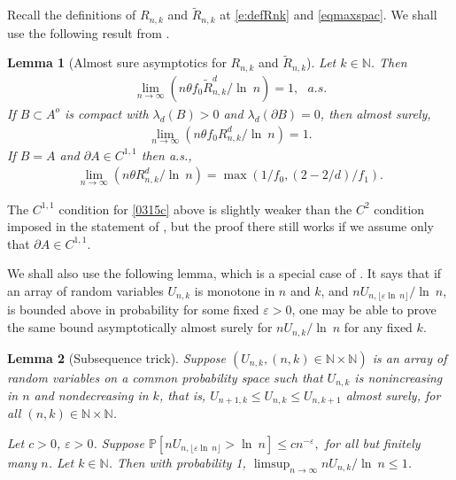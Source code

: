 \documentclass[12pt]{article}
\newcommand{\N}{\mathbb{N}}
\renewcommand{\Pr}{\mathbb{P}}
\newcommand{\tR}{{\tilde{R}}}
\newcommand{\eps}{\varepsilon}
\renewcommand{\log}{{\ln \:}}
\newtheorem{lemm}{Lemma}
\begin{document}
	Recall the definitions of $R_{n,k}$ and $\tR_{n,k}$
	at \eqref{e:defRnk} and \eqref{eqmaxspac}.
	We shall use
 the following result from \cite[Proposition 4.9 and
 Theorem 4.1]{MPCov}.

\begin{lemm}[Almost sure asymptotics for $R_{n,k}$ and $\tR_{n,k}$]
	\label{lem1}
Let  $k \in \N$.
	Then
	\begin{align}
\lim_{n \to \infty} (n \theta  f_0 \tR_{n,k}^d /\log n) =  1,
~~~ a.s.
\label{0315b}
	\end{align}
If $B \subset A^o $ is compact
	with $\lambda_d(B) >0$ and $\lambda_d(\partial B)=0$,
	then almost surely,
	\begin{align}
\lim_{n \to \infty} (n \theta  f_0 R_{n,k}^d /\log n) =  1.
\label{0315a}
	\end{align}
	If $B=A$ and $\partial A \in C^{1,1} $ %
	then
	a.s.,
	\begin{align}
	\lim_{n \to \infty} (n \theta R_{n,k}^d/\log n) =
	\max( 1/f_0, (2-2/d)/f_1).
\label{0315c}
	\end{align}
\end{lemm}
The $C^{1,1}$  condition for \eqref{0315c} above is slightly weaker
than the $C^2$ condition imposed in the statement of \cite[Proposition 4.9]{MPCov}, but the proof there still works if we assume only that $\partial A \in C^{1,1}$.

We shall also  use the following lemma, which
is a special case of \cite[Lemma 6.1]{MPCov}.
It says
that if an array of random variables $U_{n,k}$ is
monotone in $n$ and $k$, and $n U_{n,\lfloor \eps \log n \rfloor}/\log n$,
is bounded above in probability for some fixed $\eps >0$,
one may be able to prove the same bound asymptotically almost surely
for $n U_{n,k}/\log n$ for any fixed $k$.
\begin{lemm}[Subsequence trick]
\label{lemtrick}
Suppose $(U_{n,k},(n,k) \in \N \times \N)$ is an array of random
variables on a common probability space such that $U_{n,k} $ is
nonincreasing in $n$ and nondecreasing in $k$, that is,
$U_{n+1,k} \leq U_{n,k} \leq U_{n,k+1} $ almost surely,
for all $(n,k) \in \N \times \N$. 

	Let $c > 0$,  $\eps >0$. Suppose
$
\Pr[n U_{n, \lfloor  \eps \log n \rfloor } > \log n] \leq
c n^{-\eps},
$
        for all but finitely many $n$.
	Let $k \in \mathbb N$.
Then with probability 1, $ \limsup_{n \to \infty} n U_{n,k} /\log n \leq 1$.

\end{lemm}
\end{document}
